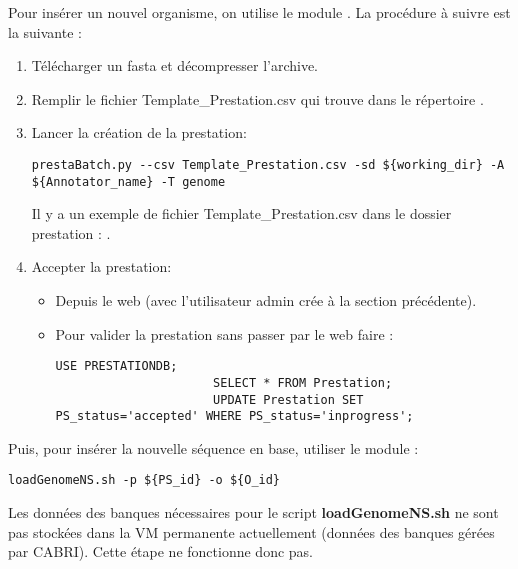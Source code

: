 Pour insérer un nouvel organisme, on utilise le module .
La procédure à suivre est la suivante :
\begin{enumerate}
    \item Télécharger un fasta et décompresser l'archive.
    \item Remplir le fichier Template\_Prestation.csv qui trouve dans le répertoire .
    \item Lancer la création de la prestation:
          \begin{lstlisting}[style=bash,gobble=14]
              prestaBatch.py --csv Template_Prestation.csv -sd ${working_dir} -A ${Annotator_name} -T genome
          \end{lstlisting}
          Il y a un exemple de fichier Template\_Prestation.csv dans le dossier prestation : .
    \item Accepter la prestation:
          \begin{itemize}
              \item Depuis le web (avec l'utilisateur admin crée à la section précédente).
              \item Pour valider la prestation sans passer par le web faire :
                    \begin{lstlisting}[style=SQL,gobble=22]
                      USE PRESTATIONDB;
                      SELECT * FROM Prestation;
                      UPDATE Prestation SET PS_status='accepted' WHERE PS_status='inprogress';
                  \end{lstlisting}
           \end{itemize}
\end{enumerate}

Puis, pour insérer la nouvelle séquence en base, utiliser le module :
\begin{lstlisting}[style=bash,gobble=4]
    loadGenomeNS.sh -p ${PS_id} -o ${O_id}
\end{lstlisting}

\begin{mycolorbox}
    Les données des banques nécessaires pour le script \textbf{loadGenomeNS.sh} ne sont pas stockées dans la VM permanente actuellement (données des banques gérées par CABRI).
    Cette étape ne fonctionne donc pas.
\end{mycolorbox}

